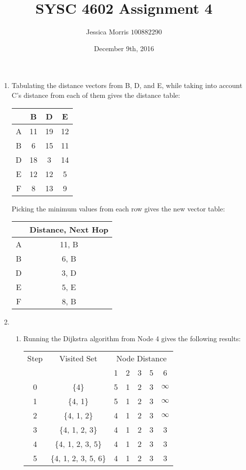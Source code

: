 \documentclass{article}
\title{SYSC 4602 Assignment 4}
\date{December 9th, 2016}
\author{Jessica Morris \(100882290\)}
\begin{document}
\maketitle

\begin{enumerate}

\item Tabulating the distance vectors from B, D, and E, while taking into account C's distance from each of them gives the distance table:

\begin{center}
\begin{tabular}{ c|c|c|c }
    & B & D & E \\
    \hline
    A & 11 & 19 & 12 \\ \hline
    B & 6 & 15 & 11 \\ \hline
    D & 18 & 3 & 14 \\ \hline
    E & 12 & 12 & 5 \\ \hline
    F & 8 & 13 & 9 \\ \hline
\end{tabular}
\end{center}

Picking the minimum values from each row gives the new vector table:
\begin{center}
\begin{tabular}{ c|c }
    & Distance, Next Hop \\
    \hline
    A & 11, B \\ \hline
    B & 6, B \\ \hline
    D & 3, D \\ \hline
    E & 5, E \\ \hline
    F & 8, B \\ \hline
\end{tabular}
\end{center}

\item
\begin{enumerate}

\item Running the Dijkstra algorithm from Node 4 gives the following results:
\begin{center}
\begin{tabular}{ |c|c|c|c|c|c|c| }
    \hline
    Step & Visited Set &  \multicolumn{5}{c|}{Node Distance} \\
     & & 1 & 2 & 3 & 5 & 6 \\
    \hline
    0 & \{4\} & 5 & 1 & 2 & 3 & $\infty$ \\ \hline
    1 & \{4, 1\} & 5 & 1 & 2 & 3 & $\infty$ \\ \hline
    2 & \{4, 1, 2\} & 4 & 1 & 2 & 3 & $\infty$ \\ \hline
    3 & \{4, 1, 2, 3\} & 4 & 1 & 2 & 3 & 3 \\ \hline
    4 & \{4, 1, 2, 3, 5\} & 4 & 1 & 2 & 3 & 3 \\ \hline
    5& \{4, 1, 2, 3, 5, 6\} & 4 & 1 & 2 & 3 & 3 \\ \hline
\end{tabular}
\end{center}


\end{enumerate}
\end{enumerate}
\end{document}
